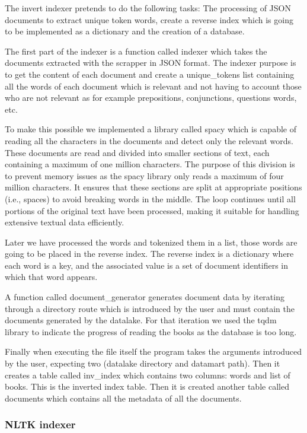 \documentclass{article}
\begin{document}
The invert indexer pretends to do the following tasks:
The processing of JSON documents to extract unique token words,
create a reverse index which is going to be implemented as a dictionary
and the creation of a database.

The first part of the indexer is a function called indexer which takes
the documents extracted with the scrapper in JSON format.
The indexer purpose is to get the content of each document
and create a unique\_tokens list containing all the words of each document
which is relevant and not having to account those who are not relevant as
for example prepositions, conjunctions, questions words, etc.

To make this possible we implemented a library called spacy
which is capable of reading all the characters in the documents
and detect only the relevant words.
These documents are read and divided into smaller sections of text,
each containing a maximum of one million characters.
The purpose of this division is to prevent memory issues as the spacy library
only reads a maximum of four million characters.
It ensures that these sections are split at appropriate positions (i.e., spaces)
to avoid breaking words in the middle.
The loop continues until all portions of the original text have been processed,
making it suitable for handling extensive textual data efficiently. 

Later we have processed the words and tokenized them in a list,
those words are going to be placed in the reverse index.
The reverse index is a dictionary where each word is a key,
and the associated value is a set of document identifiers in which that word appears.

A function called document\_generator generates document data by iterating
through a directory route which is introduced by the user and must contain
the documents generated by the datalake. For that iteration we used the tqdm
library to indicate the progress of reading the books as the database is too long.

Finally when executing the file itself the program takes the arguments introduced by the user,
expecting two (datalake directory and datamart path).
Then it creates a table called inv\_index which contains two columns:
words and list of books. This is the inverted index table.
Then it is created another table called documents which contains all the metadata of all the documents.


\subsubsection{NLTK indexer}
\end{document}
